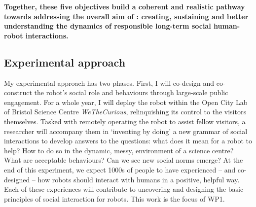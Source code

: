 \begin{framed}

\noindent\bf Together, these five objectives build a coherent and realistic pathway towards
addressing the overall aim of \project: creating, sustaining and better
understanding the dynamics of responsible long-term social human-robot
interactions.

\end{framed}










\subsection{Experimental approach}

My experimental approach has two phases. First, I will co-design and
co-construct the robot's social role and behaviours through large-scale public
engagement. For a whole year, I will deploy the \project robot within the Open
City Lab of Bristol Science Centre \emph{WeTheCurious}, relinquishing its
control to the visitors themselves. Tasked with remotely operating the robot to
assist fellow visitors, a researcher will accompany them in `inventing by doing' a new
grammar of social interactions to develop answers to the questions: what does it
mean for a robot to help? How to do so in the dynamic, messy, environment of a
science centre? What are acceptable behaviours? Can we see new social norms
emerge? At the end of this experiment, we expect 1000s of people to have
experienced -- and co-designed -- how robots should interact with humans in a
positive, helpful way. Each of these experiences will contribute to
uncovering and designing the basic principles of social interaction for robots.
This work is the focus of WP1.

